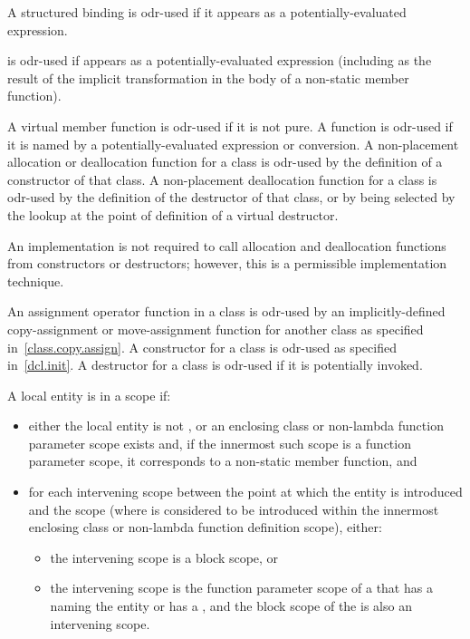 \pnum
A structured binding is odr-used if it appears as a potentially-evaluated expression.

\pnum
{} is odr-used if  appears as a potentially-evaluated expression
(including as the result of the implicit transformation in the body of a non-static
member function).

\pnum
A virtual member
function is odr-used if it is not pure.
A function is odr-used if it is named by
a potentially-evaluated expression or conversion.
A non-placement allocation or deallocation
function for a class is odr-used by the definition of a constructor of that
class. A non-placement deallocation function for a class is odr-used by the
definition of the destructor of that class, or by being selected by the
lookup at the point of definition of a virtual
destructor.
\begin{footnote}
An implementation is not required
to call allocation and
deallocation functions from constructors or destructors; however, this
is a permissible implementation technique.
\end{footnote}

\pnum
An assignment operator function in a class is odr-used by an
implicitly-defined
copy-assignment or move-assignment function for another class as specified
in~\ref{class.copy.assign}.
A constructor for a class is odr-used as specified
in~\ref{dcl.init}. A destructor for a class is odr-used if it is potentially
invoked.

\pnum
A local entity
is  in a scope if:
\begin{itemize}
\item either the local entity is not , or
an enclosing class or non-lambda function parameter scope exists and,
if the innermost such scope is a function parameter scope,
it corresponds to a non-static member function, and
\item
for each intervening scope
between the point at which the entity is introduced and the scope
(where  is considered to be introduced
within the innermost enclosing class or non-lambda function definition scope),
either:
\begin{itemize}
\item the intervening scope is a block scope, or
\item the intervening scope is the function parameter scope of a 
that has a 
naming the entity or has a , and
the block scope of the 
is also an intervening scope.
\end{itemize}
\end{itemize}

